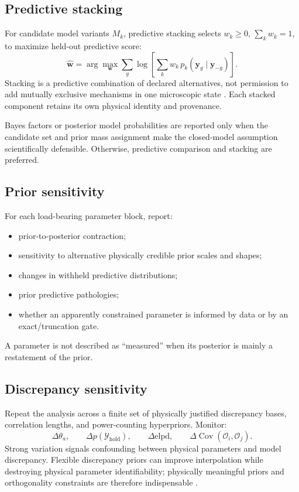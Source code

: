 \documentclass[11pt]{article}
\newcommand{\Cov}{\operatorname{Cov}}
\newcommand{\cO}{\mathcal O}
\newcommand{\cY}{\mathcal Y}
\newcommand{\hold}{\mathrm{hold}}
\begin{document}
\subsection{Predictive stacking}

For candidate model variants \(M_k\), predictive stacking selects
\(w_k\geq0\), \(\sum_k w_k=1\), to maximize held-out predictive score:
\begin{equation}
 \widehat{\bm w}
 =
 \arg\max_{\bm w}
 \sum_g
 \log\left[
 \sum_k
 w_k\,
 p_k(\bm y_g\mid\bm y_{-g})
 \right].
 \label{eq:stacking-optimization}
\end{equation}
Stacking is a predictive combination of declared alternatives, not permission
to add mutually exclusive mechanisms in one microscopic state
\cite{YaoStacking2018}.  Each stacked component retains its own physical
identity and provenance.

Bayes factors or posterior model probabilities are reported only when the
candidate set and prior mass assignment make the closed-model assumption
scientifically defensible.  Otherwise, predictive comparison and stacking are
preferred.

\subsection{Prior sensitivity}

For each load-bearing parameter block, report:
\begin{itemize}
\item prior-to-posterior contraction;
\item sensitivity to alternative physically credible prior scales and shapes;
\item changes in withheld predictive distributions;
\item prior predictive pathologies;
\item whether an apparently constrained parameter is informed by data or by an
exact/truncation gate.
\end{itemize}
A parameter is not described as ``measured'' when its posterior is mainly a
restatement of the prior.

\subsection{Discrepancy sensitivity}

Repeat the analysis across a finite set of physically justified discrepancy
bases, correlation lengths, and power-counting hyperpriors.  Monitor:
\begin{equation}
 \Delta\theta_a,
 \qquad
 \Delta p(\cY_{\hold}),
 \qquad
 \Delta\mathrm{elpd},
 \qquad
 \Delta \Cov(\cO_i,\cO_j).
 \label{eq:discrepancy-sensitivity}
\end{equation}
Strong variation signals confounding between physical parameters and model
discrepancy.  Flexible discrepancy priors can improve interpolation while
destroying physical parameter identifiability; physically meaningful priors
and orthogonality constraints are therefore indispensable
\cite{KennedyOHagan2001,BrynjarsdottirOHagan2014}.
\end{document}
